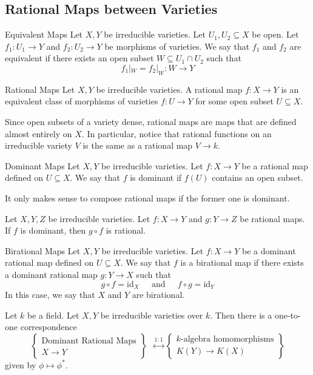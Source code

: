 \documentclass[a4paper]{article}
\begin{document}
\subsection{Rational Maps between Varieties}
\begin{defn}{Equivalent Maps}{} Let $X,Y$ be irreducible varieties. Let $U_1,U_2\subseteq X$ be open. Let $f_1:U_1\to Y$ and $f_2:U_2\to Y$ be morphisms of varieties. We say that $f_1$ and $f_2$ are equivalent if there exists an open subset $W\subseteq U_1\cap U_2$ such that $$f_1|_W=f_2|_W:W\to Y$$
\end{defn}

\begin{defn}{Rational Maps}{} Let $X,Y$ be irreducible varieties. A rational map $f:X\to Y$ is an equivalent class of morphisms of varieties $f:U\to Y$ for some open subset $U\subseteq X$. 
\end{defn}

Since open subsets of a variety dense, rational maps are maps that are defined almost entirely on $X$. In particular, notice that rational functions on an irreducible variety $V$ is the same as a rational map $V\to k$. 

\begin{defn}{Dominant Maps}{} Let $X,Y$ be irreducible varieties. Let $f:X\to Y$ be a rational map defined on $U\subseteq X$. We say that $f$ is dominant if $f(U)$ contains an open subset. 
\end{defn}

It only makes sense to compose rational maps if the former one is dominant. 

\begin{prp}{}{} Let $X,Y,Z$ be irreducible varieties. Let $f:X\to Y$ and $g:Y\to Z$ be rational maps. If $f$ is dominant, then $g\circ f$ is rational. 
\end{prp}

\begin{defn}{Birational Maps}{} Let $X,Y$ be irreducible varieties. Let $f:X\to Y$ be a dominant rational map defined on $U\subseteq X$. We say that $f$ is a birational map if there exists a dominant rational map $g:Y\to X$ such that $$g\circ f=\text{id}_X\;\;\;\;\text{ and }\;\;\;\;f\circ g=\text{id}_Y$$ In this case, we say that $X$ and $Y$ are birational. 
\end{defn}

\begin{prp}{}{} Let $k$ be a field. Let $X,Y$ be irreducible varieties over $k$. Then there is a one-to-one correspondence $$\left\{\substack{\text{Dominant Rational Maps}\\X\to Y}\right\}\;\;\overset{1:1}{\longleftrightarrow}\left\{\substack{k\text{-algebra homomorphisms}\\K(Y)\to K(X)}\right\}$$ given by $\phi\mapsto\phi^\ast$. 
\end{prp}
\end{document}
